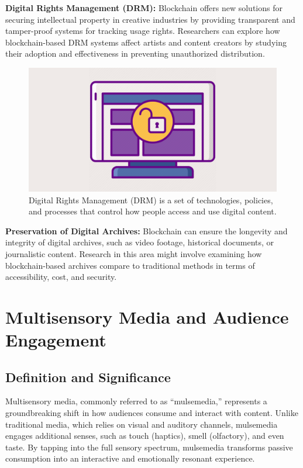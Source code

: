 \documentclass[
]{book}
\begin{document}
\textbf{Digital Rights Management (DRM):} Blockchain offers new solutions for securing intellectual property in creative industries by providing transparent and tamper-proof systems for tracking usage rights. Researchers can explore how blockchain-based DRM systems affect artists and content creators by studying their adoption and effectiveness in preventing unauthorized distribution.

\begin{figure}
\centering
\includegraphics[width=1\textwidth,height=\textheight]{images/drm.png}
\caption{Digital Rights Management (DRM) is a set of technologies, policies, and processes that control how people access and use digital content.}
\end{figure}

\textbf{Preservation of Digital Archives:} Blockchain can ensure the longevity and integrity of digital archives, such as video footage, historical documents, or journalistic content. Research in this area might involve examining how blockchain-based archives compare to traditional methods in terms of accessibility, cost, and security.

\section{Multisensory Media and Audience Engagement}\label{multisensory-media-and-audience-engagement}

\subsection{Definition and Significance}\label{definition-and-significance}

Multisensory media, commonly referred to as ``mulsemedia,'' represents a groundbreaking shift in how audiences consume and interact with content. Unlike traditional media, which relies on visual and auditory channels, mulsemedia engages additional senses, such as touch (haptics), smell (olfactory), and even taste. By tapping into the full sensory spectrum, mulsemedia transforms passive consumption into an interactive and emotionally resonant experience.
\end{document}
